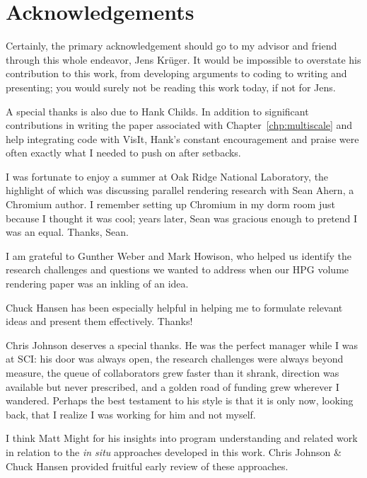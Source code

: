 \section*{Acknowledgements}

Certainly, the primary acknowledgement should go to my advisor and
friend through this whole endeavor, Jens Kr\"uger.  It would be
impossible to overstate his contribution to this work, from developing
arguments to coding to writing and presenting; you would surely not be
reading this work today, if not for Jens.

A special thanks is also due to Hank Childs.  In addition to
significant contributions in writing the paper associated with
Chapter~\ref{chp:multiscale} and help integrating code with VisIt,
Hank's constant encouragement and praise were often exactly what I
needed to push on after setbacks.

I was fortunate to enjoy a summer at Oak Ridge National Laboratory, the
highlight of which was discussing parallel rendering research with Sean
Ahern, a Chromium author.  I remember setting up Chromium in my dorm
room just because I thought it was cool; years later, Sean was gracious
enough to pretend I was an equal.  Thanks, Sean.

I am grateful to Gunther Weber and Mark Howison, who helped us identify
the research challenges and questions we wanted to address when our HPG
volume rendering paper was an inkling of an idea.

Chuck Hansen has been especially helpful in helping me to formulate
relevant ideas and present them effectively.  Thanks!


Chris Johnson deserves a special thanks.  He was the perfect manager
while I was at SCI: his door was always open, the research challenges
were always beyond measure, the queue of collaborators grew faster than
it shrank, direction was available but never prescribed, and a golden
road of funding grew wherever I wandered.  Perhaps the best testament
to his style is that it is only now, looking back, that I realize I was
working for him and not myself.

I think Matt Might for his insights into program understanding and
related work in relation to the \textit{in situ} approaches developed
in this work.  Chris Johnson \& Chuck Hansen provided fruitful early
review of these approaches.

